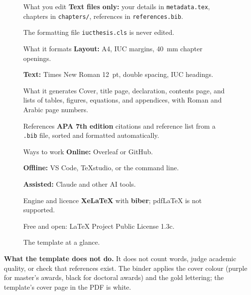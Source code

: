\documentclass[11pt,a4paper]{article}
\newcommand\file[1]{\texttt{#1}}
\begin{document}
\begin{figure}[htbp]
\begin{tcbraster}[raster columns=2,raster equal height=rows,raster column skip=9pt,
  raster row skip=9pt]
\begin{card}{What you edit}
  \textbf{Text files only:} your details in \file{metadata.tex}, chapters in
  \file{chapters/}, references in \file{references.bib}.\par
  The formatting file \file{iucthesis.cls} is never edited.
\end{card}
\begin{card}{What it formats}
  \textbf{Layout:} A4, IUC margins, 40~mm chapter openings.\par
  \textbf{Text:} Times New Roman 12~pt, double spacing, IUC headings.
\end{card}
\begin{card}{What it generates}
  Cover, title page, declaration, contents page, and lists of tables, figures,
  equations, and appendices, with Roman and Arabic page numbers.
\end{card}
\begin{card}{References}
  \textbf{APA 7th edition} citations and reference list from a
  \file{.bib} file, sorted and formatted automatically.
\end{card}
\begin{card}{Ways to work}
  \textbf{Online:} Overleaf or GitHub.\par
  \textbf{Offline:} VS Code, TeXstudio, or the command line.\par
  \textbf{Assisted:} Claude and other AI tools.
\end{card}
\begin{card}{Engine and licence}
  \textbf{XeLaTeX} with \textbf{biber}; pdfLaTeX is not supported.\par
  Free and open: LaTeX Project Public License 1.3c.
\end{card}
\end{tcbraster}
\caption{The template at a glance.}
\label{fig:glance}
\end{figure}

\textbf{What the template does not do.} It does not count words, judge academic
quality, or check that references exist. The binder applies the cover colour
(purple for master's awards, black for doctoral awards) and the gold lettering;
the template's cover page in the PDF is white.

\end{document}
